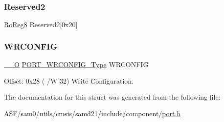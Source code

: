 \subsubsection{\texorpdfstring{Reserved2}{Reserved2}}
{\footnotesize\ttfamily \mbox{\hyperlink{group___s_a_m_d21_e15_a__definitions_ga0d957f1433aaf5d70e4dc2b68288442d}{Ro\+Reg8}} Reserved2\mbox{[}0x20\mbox{]}}

\mbox{\label{struct_port_group_a4a3b3dee5230a97dcec3017868e2f5d8}} 
\subsubsection{\texorpdfstring{WRCONFIG}{WRCONFIG}}
{\footnotesize\ttfamily \mbox{\hyperlink{core__cm0plus_8h_a7e25d9380f9ef903923964322e71f2f6}{\+\_\+\+\_\+O}} \mbox{\hyperlink{union_p_o_r_t___w_r_c_o_n_f_i_g___type}{P\+O\+R\+T\+\_\+\+W\+R\+C\+O\+N\+F\+I\+G\+\_\+\+Type}} W\+R\+C\+O\+N\+F\+IG}



Offset\+: 0x28 ( /W 32) Write Configuration. 



The documentation for this struct was generated from the following file\+:\begin{DoxyCompactItemize}
\item 
A\+S\+F/sam0/utils/cmsis/samd21/include/component/\mbox{\hyperlink{utils_2cmsis_2samd21_2include_2component_2port_8h}{port.\+h}}\end{DoxyCompactItemize}
